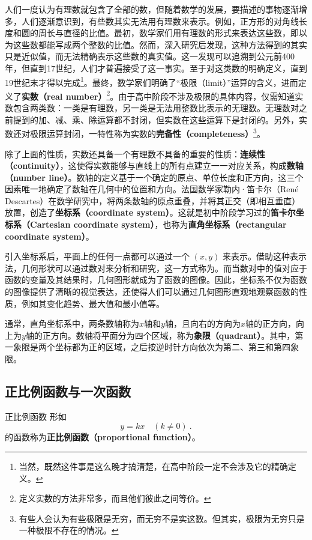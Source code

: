 人们一度认为有理数就包含了全部的数，但随着数学的发展，要描述的事物逐渐增多，人们逐渐意识到，有些数其实无法用有理数来表示。例如，正方形的对角线长度和圆的周长与直径的比值。最初，数学家们用有理数的形式来表达这些数，即以为这些数都能写成两个整数的比值。然而，深入研究后发现，这种方法得到的其实只是近似值，而无法精确表示这些数的真实值。这一发现可以追溯到公元前400年，但直到17世纪，人们才普遍接受了这一事实。至于对这类数的明确定义，直到19世纪末才得以完成\footnote{当然，既然这件事是这么晚才搞清楚，在高中阶段一定不会涉及它的精确定义。}。最终，数学家们明确了“极限（limit）”运算的含义，进而定义了\textbf{实数（real number）}\footnote{定义实数的方法非常多，而且他们彼此之间等价。}。由于高中阶段不涉及极限的具体内容，仅需知道实数包含两类数：一类是有理数，另一类是无法用整数比表示的无理数。无理数对之前提到的加、减、乘、除运算都不封闭，但实数在这些运算下是封闭的。另外，实数还对极限运算封闭，一特性称为实数的\textbf{完备性（completeness）}\footnote{有些人会认为有些极限是无穷，而无穷不是实这数。但其实，极限为无穷只是一种极限不存在的情况。}。

除了上面的性质，实数还具备一个有理数不具备的重要的性质：\textbf{连续性（continuity）}，这使得实数能够与直线上的所有点建立一一对应关系，构成\textbf{数轴（number line）}。数轴的定义基于一个确定的原点、单位长度和正方向，这三个因素唯一地确定了数轴在几何中的位置和方向。法国数学家勒内·笛卡尔（René Descartes）在数学研究中，将两条数轴的原点重叠，并将其正交（即相互垂直）放置，创造了\textbf{坐标系（coordinate system）}。这就是初中阶段学习过的\textbf{笛卡尔坐标系（Cartesian coordinate system）}，也称为\textbf{直角坐标系（rectangular coordinate system）}。

引入坐标系后，平面上的任何一点都可以通过一个 $(x, y)$ 来表示。借助这种表示法，几何形状可以通过数对来分析和研究，这一方式称为。而当数对中的值对应于函数的变量及其结果时，几何图形就成为了函数的图像。因此，坐标系不仅为函数的图像提供了清晰的视觉表达，还使得人们可以通过几何图形直观地观察函数的性质，例如其变化趋势、最大值和最小值等。

通常，直角坐标系中，两条数轴称为$x$轴和$y$轴，且向右的方向为$x$轴的正方向，向上为$y$轴的正方向。数轴将平面分为四个区域，称为\textbf{象限（quadrant）}。其中，第一象限是两个坐标都为正的区域，之后按逆时针方向依次为第二、第三和第四象限。

\subsection{正比例函数与一次函数}

\begin{definition}{正比例函数}
形如
\begin{equation}
y = kx\quad(k\neq0)~.
\end{equation}
的函数称为\textbf{正比例函数（proportional function）}。
\end{definition}

